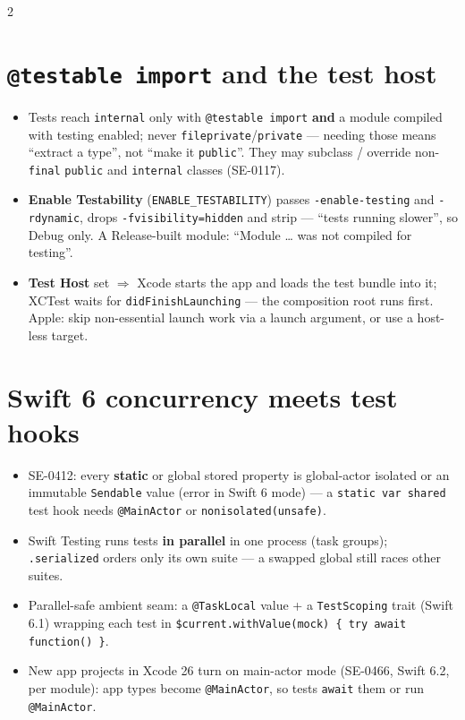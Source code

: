 \documentclass[8pt]{extarticle}
\newcommand\ct[1]{\texttt{#1}}
\begin{document}
\begin{multicols}{2}
\section{\texttt{@testable import} and the test host}
\begin{itemize}
  \item Tests reach \ct{internal} only with \ct{@testable import} \textbf{and} a module compiled
        with testing enabled; never \ct{fileprivate}/\ct{private} — needing those means
        ``extract a type'', not ``make it \ct{public}''. They may subclass / override
        non-\ct{final} \ct{public} and \ct{internal} classes (SE-0117).
  \item \textbf{Enable Testability} (\ct{ENABLE\_TESTABILITY}) passes \ct{-enable-testing} and
        \ct{-rdynamic}, drops \ct{-fvisibility=hidden} and strip — ``tests running slower'', so
        Debug only. A Release-built module: ``Module \ldots{} was not compiled for testing''.
  \item \textbf{Test Host} set $\Rightarrow$ Xcode starts the app and loads the test bundle into
        it; XCTest waits for \ct{didFinishLaunching} — the composition root runs first. Apple:
        skip non-essential launch work via a launch argument, or use a host-less target.
\end{itemize}

\section{Swift 6 concurrency meets test hooks}
\begin{itemize}
  \item SE-0412: every \textbf{static} or global stored property is global-actor isolated or an
        immutable \ct{Sendable} value (error in Swift 6 mode) — a \ct{static var shared} test
        hook needs \ct{@MainActor} or \ct{nonisolated(unsafe)}.
  \item Swift Testing runs tests \textbf{in parallel} in one process (task groups);
        \ct{.serialized} orders only its own suite — a swapped global still races other suites.
  \item Parallel-safe ambient seam: a \ct{@TaskLocal} value + a \ct{TestScoping} trait (Swift
        6.1) wrapping each test in \ct{\$current.withValue(mock) \{ try await function() \}}.
  \item New app projects in Xcode 26 turn on main-actor mode (SE-0466, Swift 6.2, per module):
        app types become \ct{@MainActor}, so tests \ct{await} them or run \ct{@MainActor}.
\end{itemize}


\end{multicols}
\end{document}
